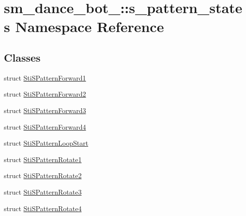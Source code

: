 \hypertarget{namespacesm__dance__bot__2_1_1s__pattern__states}{}\section{sm\+\_\+dance\+\_\+bot\+\_\+:\+:s\+\_\+pattern\+\_\+states Namespace Reference}
\label{namespacesm__dance__bot__2_1_1s__pattern__states}
\subsection*{Classes}
\begin{DoxyCompactItemize}
\item 
struct \hyperlink{structsm__dance__bot__2_1_1s__pattern__states_1_1StiSPatternForward1}{Sti\+S\+Pattern\+Forward1}
\item 
struct \hyperlink{structsm__dance__bot__2_1_1s__pattern__states_1_1StiSPatternForward2}{Sti\+S\+Pattern\+Forward2}
\item 
struct \hyperlink{structsm__dance__bot__2_1_1s__pattern__states_1_1StiSPatternForward3}{Sti\+S\+Pattern\+Forward3}
\item 
struct \hyperlink{structsm__dance__bot__2_1_1s__pattern__states_1_1StiSPatternForward4}{Sti\+S\+Pattern\+Forward4}
\item 
struct \hyperlink{structsm__dance__bot__2_1_1s__pattern__states_1_1StiSPatternLoopStart}{Sti\+S\+Pattern\+Loop\+Start}
\item 
struct \hyperlink{structsm__dance__bot__2_1_1s__pattern__states_1_1StiSPatternRotate1}{Sti\+S\+Pattern\+Rotate1}
\item 
struct \hyperlink{structsm__dance__bot__2_1_1s__pattern__states_1_1StiSPatternRotate2}{Sti\+S\+Pattern\+Rotate2}
\item 
struct \hyperlink{structsm__dance__bot__2_1_1s__pattern__states_1_1StiSPatternRotate3}{Sti\+S\+Pattern\+Rotate3}
\item 
struct \hyperlink{structsm__dance__bot__2_1_1s__pattern__states_1_1StiSPatternRotate4}{Sti\+S\+Pattern\+Rotate4}
\end{DoxyCompactItemize}
